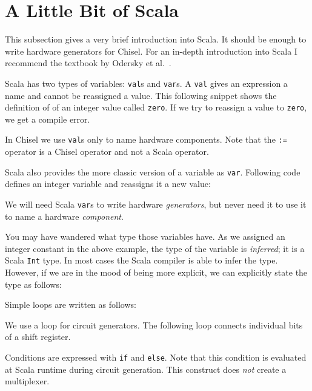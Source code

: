 \documentclass[%
    10pt,
    headinclude, footexclude,
    openright, %
    notitlepage,
    cleardoubleempty,
    headsepline,
    pointlessnumbers,
    bibtotoc, idxtotoc,
    ]{scrbook}
\newcommand{\code}[1]{{\small{\texttt{#1}}}}
\begin{document}
\section{A Little Bit of Scala}

This subsection gives a very brief introduction into Scala. It should be enough
to write hardware generators for Chisel.
For an in-depth introduction into Scala I recommend the textbook by Odersky et al.~\cite{Scala}.

Scala has two types of variables: \code{val}s and \code{var}s. A \code{val} gives an expression
a name and cannot be reassigned a value. This following snippet shows the definition of
of an integer value called \code{zero}. If we try to reassign a value to \code{zero}, we get
a compile error.


\noindent In Chisel we use \code{val}s only to name hardware components. Note that the \code{:=}
operator is a Chisel operator and not a Scala operator.

Scala also provides the more classic version of a variable as \code{var}. Following code defines
an integer variable and reassigns it a new value:


\noindent We will need Scala \code{var}s to write hardware \emph{generators}, but never need
it to use it to name a hardware \emph{component}.

You may have wandered what type those variables have. As we assigned an integer constant
in the above example, the type of the variable is \emph{inferred}; it is a Scala \code{Int} type.
In most cases the Scala compiler is able to infer the type. However, if we are in the mood of
being more explicit, we can explicitly state the type as follows:


Simple loops are written as follows:


We use a loop for circuit generators. The following loop connects individual bits
of a shift register.


Conditions are expressed with \code{if} and \code{else}. Note that this condition
is evaluated at Scala runtime during circuit generation. This construct does \emph{not}
create a multiplexer.
\end{document}
